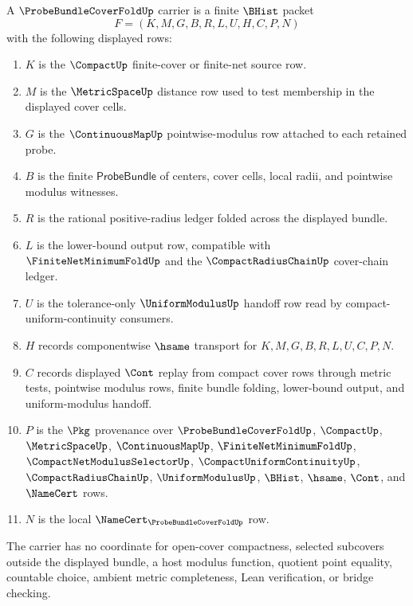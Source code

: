 \begin{definition}
\label{def:probe-bundle-cover-fold-carrier}
A $\ProbeBundleCoverFoldUp$ carrier is a finite $\BHist$ packet
$$
F=(K,M,G,B,R,L,U,H,C,P,N)
$$
with the following displayed rows:
\begin{enumerate}
\item $K$ is the $\CompactUp$ finite-cover or finite-net source row.
\item $M$ is the $\MetricSpaceUp$ distance row used to test membership in the displayed cover cells.
\item $G$ is the $\ContinuousMapUp$ pointwise-modulus row attached to each retained probe.
\item $B$ is the finite $\mathsf{ProbeBundle}$ of centers, cover cells, local radii, and pointwise modulus witnesses.
\item $R$ is the rational positive-radius ledger folded across the displayed bundle.
\item $L$ is the lower-bound output row, compatible with $\FiniteNetMinimumFoldUp$ and the $\CompactRadiusChainUp$ cover-chain ledger.
\item $U$ is the tolerance-only $\UniformModulusUp$ handoff row read by compact-uniform-continuity consumers.
\item $H$ records componentwise $\hsame$ transport for $K,M,G,B,R,L,U,C,P,N$.
\item $C$ records displayed $\Cont$ replay from compact cover rows through metric tests, pointwise modulus rows, finite bundle folding, lower-bound output, and uniform-modulus handoff.
\item $P$ is the $\Pkg$ provenance over $\ProbeBundleCoverFoldUp$, $\CompactUp$, $\MetricSpaceUp$, $\ContinuousMapUp$, $\FiniteNetMinimumFoldUp$, $\CompactNetModulusSelectorUp$, $\CompactUniformContinuityUp$, $\CompactRadiusChainUp$, $\UniformModulusUp$, $\BHist$, $\hsame$, $\Cont$, and $\NameCert$ rows.
\item $N$ is the local $\NameCert_{\ProbeBundleCoverFoldUp}$ row.
\end{enumerate}
The carrier has no coordinate for open-cover compactness, selected subcovers outside the displayed bundle, a host modulus function, quotient point equality, countable choice, ambient metric completeness, Lean verification, or bridge checking.
\end{definition}

